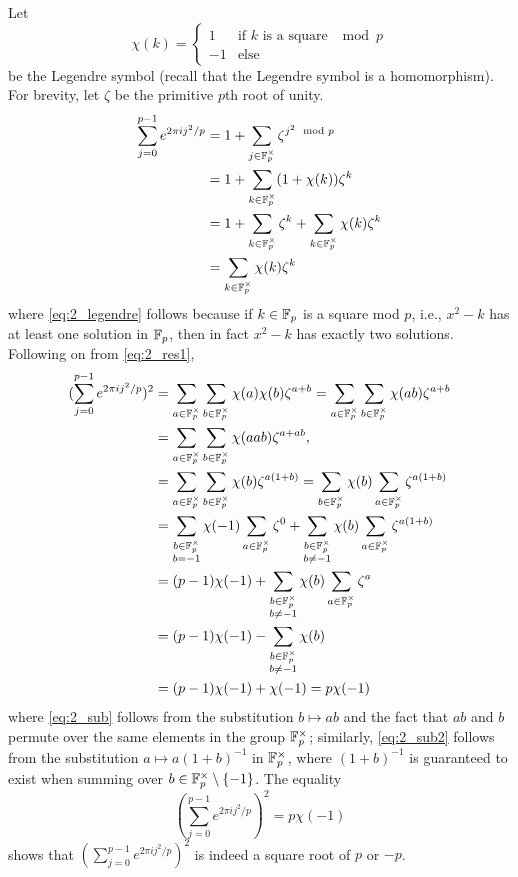 \documentclass[12pt]{article}
\begin{document}
Let 
$$\chi(k) = \begin{cases} 
  1 & \text{if } k \text{ is a square } \mod p \\ 
  -1 & \text{else} 
\end{cases}$$
be the Legendre symbol (recall that the Legendre symbol is a homomorphism). 
For brevity, let $\zeta$ be the primitive $p$th root of unity. 
\begin{align}
  \sum_{j = 0}^{p - 1} e^{2\pi i j^2 / p} 
  & = 1 + \sum_{j \in \mathbb{F}_p^{\times}} \zeta^{j^2 \mod p} \nonumber \\ 
  & = 1 + \sum_{k \in \mathbb{F}_p^{\times}} (1 + \chi(k)) \zeta^k  \label{eq:2_legendre} \\ 
  & = 1 + \sum_{k \in \mathbb{F}_p^{\times}} \zeta^k + \sum_{k \in \mathbb{F}_p^{\times}} \chi(k) \zeta^k \nonumber \\ 
  & = \sum_{k \in \mathbb{F}_p^{\times}} \chi(k) \zeta^k \label{eq:2_res1} 
\end{align}
where \eqref{eq:2_legendre} follows because if $k \in \mathbb{F}_p$ is a square mod $p$, i.e., $x^2 - k$ has at least one solution in $\mathbb{F}_p$, then in fact $x^2 - k$ has exactly two solutions. 
Following on from \eqref{eq:2_res1}, 
\newcommand{\field}{\F_p^{\times}}  
\begin{align}
  (\sum_{j = 0}^{p - 1} e^{2\pi i j^2 / p})^{2} 
  & = \sum_{a \in \field}\sum_{b \in \field} \chi(a) \chi(b) \zeta^{a + b}  \nonumber = \sum_{a \in \field} \sum_{b \in \field} \chi(ab) \zeta^{a + b}  \nonumber \\ 
  & = \sum_{a \in \field} \sum_{b \in \field} \chi(a ab) \zeta^{a + ab}, \label{eq:2_sub}  \\ 
  & = \sum_{a \in \field} \sum_{b \in \field} \chi(b) \zeta^{a(1 + b)} \nonumber = \sum_{b \in \field} \chi(b) \sum_{a \in \field} \zeta^{a(1 + b)} \nonumber \\ 
  & = \sum_{\substack{b \in \field \\ b = -1}} \chi(-1) \sum_{a \in \field} \zeta^{0} + \sum_{\substack{b \in \field \\ b \neq -1}} \chi(b) \sum_{a \in \field} \zeta^{a(1 + b)} \nonumber \\ 
  & = (p - 1)\chi(-1) + \sum_{\substack{b \in \field \\ b \neq -1}} \chi(b) \sum_{a \in \field} \zeta^{a} \label{eq:2_sub2} \\ 
  & = (p - 1)\chi(-1) - \sum_{\substack{b \in \field\\ b \neq -1}} \chi(b) \nonumber \\ 
  & = (p - 1)\chi(-1) + \chi(-1) = p\chi(-1) \nonumber
\end{align}
where \eqref{eq:2_sub} follows from the substitution $b \mapsto ab$ and the fact that $ab$ and $b$ permute over the same elements in the group $\field$; 
similarly, \eqref{eq:2_sub2} follows from the substitution $a \mapsto a(1 + b)^{-1}$ in $\mathbb{F}_p^{\times}$, where $(1 + b)^{-1}$ is guaranteed to exist when summing over $b \in \mathbb{F}_p^\times \setminus \{-1\}$. 
The equality 
$$ (\sum_{j = 0}^{p - 1} e^{2\pi i j^2 / p})^{2} = p\chi(-1)$$ 
shows that $(\sum_{j = 0}^{p - 1} e^{2\pi i j^2 / p})^{2}$ is indeed a square root of $p$ or $-p$. 
\end{document}
